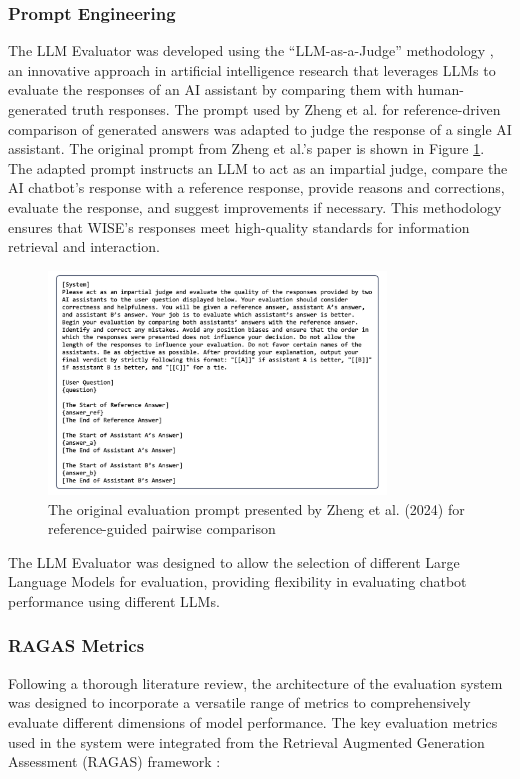 \subsubsection{Prompt Engineering}

The LLM Evaluator was developed using the “LLM-as-a-Judge” methodology \cite{zheng2024judging}, an innovative approach in artificial intelligence research that leverages LLMs to evaluate the responses of an AI assistant by comparing them with human-generated truth responses. The prompt used by Zheng et al. \cite{zheng2024judging} for reference-driven comparison of generated answers was adapted to judge the response of a single AI assistant. The original prompt from Zheng et al.'s paper \cite{zheng2024judging} is shown in Figure \ref{fig:llme-prompt}. The adapted prompt instructs an LLM to act as an impartial judge, compare the AI chatbot's response with a reference response, provide reasons and corrections, evaluate the response, and suggest improvements if necessary. This methodology ensures that WISE's responses meet high-quality standards for information retrieval and interaction.

\begin{figure}[h!]
    \centering
    \includegraphics[width=0.8\textwidth]{images/llme/zheng-prompt-original.png}
    \caption{The original evaluation prompt presented by Zheng et al. (2024) for reference-guided pairwise comparison \cite{zheng2024judging}}
    \label{fig:llme-prompt}
\end{figure}

 The LLM Evaluator was designed to allow the selection of different Large Language Models for evaluation, providing flexibility in evaluating chatbot performance using different LLMs.

\subsubsection{RAGAS Metrics}
Following a thorough literature review, the architecture of the evaluation system was designed to incorporate a versatile range of metrics to comprehensively evaluate different dimensions of model performance. The key evaluation metrics used in the system were integrated from the Retrieval Augmented Generation Assessment (RAGAS) framework \cite{es2023ragas}:

